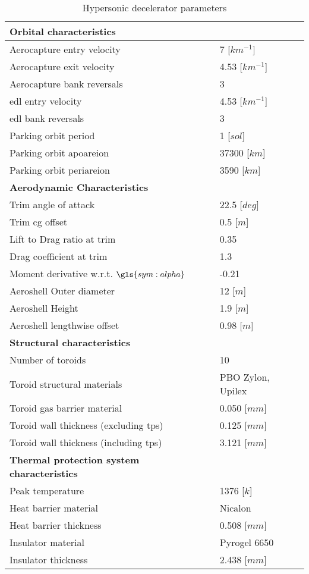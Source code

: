 \begin{table}[H]
	\centering
	\caption{Hypersonic decelerator parameters}
	\label{tab:DeceleratorPar}
	\begin{tabular}{|p{}|p{}|} \hline
		\textbf{Orbital characteristics}             	& 			\\ \hline \hline
		Aerocapture entry velocity       				&	 7 [$km^{-1}$] 		\\ \hline
		Aerocapture exit velocity				 		&    4.53 [$km^{-1}$]  	  	\\ \hline
		Aerocapture bank reversals				        &  	 3 		\\ \hline
		\gls{edl} entry velocity					 	&  	 4.53 [$km^{-1}$]	\\ \hline
		\gls{edl} bank reversals					 	&  	 3	\\ \hline
		Parking orbit period						 	&  	 1 [$sol$]		\\ \hline
		Parking orbit apoareion			 				&  	37300 [$km$]		\\ \hline
		Parking orbit periareion			 			&  	3590 [$km$]		\\ \hline
		\textbf{Aerodynamic Characteristics}			&			\\ \hline \hline
		Trim angle of attack				 			&  22.5 [$deg$]			\\ \hline
		Trim \gls{cg} offset							&  0.5 [$m$]		\\ \hline
		Lift to Drag ratio at trim			 			&  	0.35	\\ \hline
		Drag coefficient at trim			 			&  	1.3	\\ \hline
		Moment derivative w.r.t. $\gls{sym:alpha}$		&  	-0.21		\\ \hline
		Aeroshell Outer diameter						&  	12 [$m$]		\\ \hline
		Aeroshell Height								&  	1.9 [$m$]		\\ \hline
		Aeroshell lengthwise offset						&  	0.98 [$m$]		\\ \hline
		\textbf{Structural characteristics}				&			\\ \hline \hline
		Number of toroids					 			&   10			\\ \hline 
		Toroid structural materials						 			&  	PBO Zylon, Upilex		\\ \hline
		Toroid gas barrier material		&	0.050 [$mm$]		\\ \hline
		Toroid wall thickness (excluding \gls{tps})		&	0.125 [$mm$]		\\ \hline
		Toroid wall thickness (including \gls{tps})		&	3.121 [$mm$]		\\ \hline
		\textbf{Thermal protection system characteristics}	&		\\ \hline \hline
		Peak temperature							&	 1376 [$k$]		\\ \hline
		Heat barrier material							&	Nicalon		\\ \hline
		Heat barrier thickness							&	0.508 [$mm$]		\\ \hline
		Insulator material								&	Pyrogel 6650		\\ \hline
		Insulator thickness								&	2.438 [$mm$]		\\ \hline
			

\end{tabular}
\end{table}

